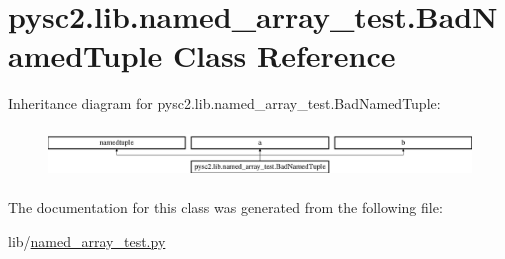 \hypertarget{classpysc2_1_1lib_1_1named__array__test_1_1_bad_named_tuple}{}\section{pysc2.\+lib.\+named\+\_\+array\+\_\+test.\+Bad\+Named\+Tuple Class Reference}
\label{classpysc2_1_1lib_1_1named__array__test_1_1_bad_named_tuple}
Inheritance diagram for pysc2.\+lib.\+named\+\_\+array\+\_\+test.\+Bad\+Named\+Tuple\+:\begin{figure}[H]
\begin{center}
\leavevmode
\includegraphics[height=1.372549cm]{classpysc2_1_1lib_1_1named__array__test_1_1_bad_named_tuple}
\end{center}
\end{figure}


The documentation for this class was generated from the following file\+:\begin{DoxyCompactItemize}
\item 
lib/\mbox{\hyperlink{named__array__test_8py}{named\+\_\+array\+\_\+test.\+py}}\end{DoxyCompactItemize}
